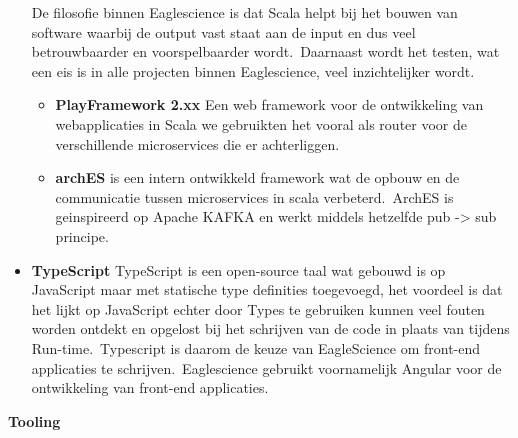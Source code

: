 \begin{itemize}
De filosofie binnen Eaglescience is dat Scala helpt bij het bouwen van software waarbij de output vast staat aan de input en dus veel betrouwbaarder en voorspelbaarder wordt.\ Daarnaast wordt het testen, wat een eis is in alle projecten binnen Eaglescience, veel inzichtelijker wordt.
  \begin{itemize}
    \item \textbf{PlayFramework 2.xx} Een web framework voor de ontwikkeling van webapplicaties in Scala we gebruikten het vooral als router voor de verschillende microservices die er achterliggen.
    \item \textbf{archES} is een intern ontwikkeld framework wat de opbouw en de communicatie tussen microservices in scala verbeterd.\ ArchES is geinspireerd op Apache KAFKA en werkt middels hetzelfde pub -> sub principe.
  \end{itemize}
\item \textbf{TypeScript} TypeScript is een open-source taal wat gebouwd is op JavaScript maar met statische type definities toegevoegd, het voordeel is dat het lijkt op JavaScript echter door Types te gebruiken kunnen veel fouten worden ontdekt en opgelost bij het schrijven van de code in plaats van tijdens Run-time.\ Typescript is daarom de keuze van EagleScience om front-end applicaties te schrijven.\ Eaglescience gebruikt voornamelijk Angular voor de ontwikkeling van front-end applicaties.
\end{itemize}
\textbf{Tooling}
